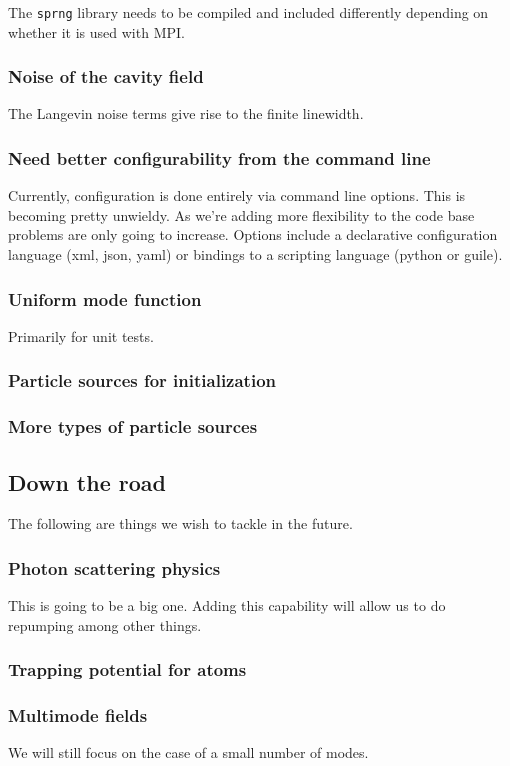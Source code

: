\documentclass[aps, superscriptaddress, groupedaddress, preprint]{revtex4}
\begin{document}
The \verb~sprng~ library needs to be compiled and included
differently depending on whether it is used with MPI.


\subsubsection{Noise of the cavity field}

The Langevin noise terms give rise to the finite linewidth.


\subsubsection{Need better configurability from the command line}

Currently, configuration is done entirely via command line
options.  This is becoming pretty unwieldy.  As we're adding more
flexibility to  the code base problems are only going to
increase.  Options include a declarative configuration language
(xml, json, yaml) or bindings to a scripting language (python or
guile).


\subsubsection{Uniform mode function}

 Primarily for unit tests.


\subsubsection{Particle sources for initialization}


\subsubsection{More types of particle sources}


\subsection{Down the road}

The following are things we wish to tackle in the future.


\subsubsection{Photon scattering physics} This is going to be a big
one.  Adding this capability will allow us to do repumping among
other things.


\subsubsection{Trapping potential for atoms}


\subsubsection{Multimode fields} We will still focus on the case
of a small number of modes.
\end{document}
